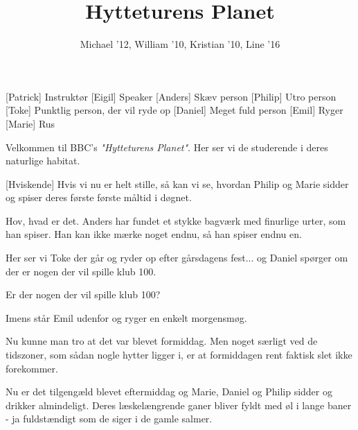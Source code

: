 \documentclass[a4paper,11pt]{article}
\title{Hytteturens Planet}
\author{Michael '12, William '10, Kristian '10, Line '16}
\begin{document}
\maketitle

\begin{roles}
[Patrick] Instruktør
[Eigil] Speaker
[Anders] Skæv person
[Philip] Utro person
[Toke] Punktlig person, der vil ryde op
[Daniel] Meget fuld person
[Emil] Ryger
[Marie] Rus
\end{roles}

\begin{props}
\end{props}

\begin{sketch}

 Velkommen til BBC's \emph{"Hytteturens Planet"}. Her ser vi de studerende i deres naturlige habitat.

[Hviskende] Hvis vi nu er helt stille, så kan vi se, hvordan Philip og Marie sidder og spiser deres første første måltid i døgnet.


 Hov, hvad er det. Anders har fundet et stykke bagværk med finurlige urter, som han spiser. Han kan ikke mærke noget endnu, så han spiser endnu en.


 Her ser vi Toke der går og ryder op efter gårsdagens fest... og Daniel spørger om der er nogen der vil spille klub 100.

 Er der nogen der vil spille klub 100?

 Imens står Emil udenfor og ryger en enkelt morgensmøg.



 Nu kunne man tro at det var blevet formiddag. Men noget særligt ved de tidszoner, som sådan nogle hytter ligger i, er at formiddagen rent faktisk slet ikke forekommer.



 Nu er det tilgengæld blevet eftermiddag og Marie, Daniel og Philip sidder og drikker almindeligt. Deres læskelængrende ganer bliver fyldt med øl i lange baner - ja fuldstændigt som de siger i de gamle salmer.


\end{sketch}
\end{document}
